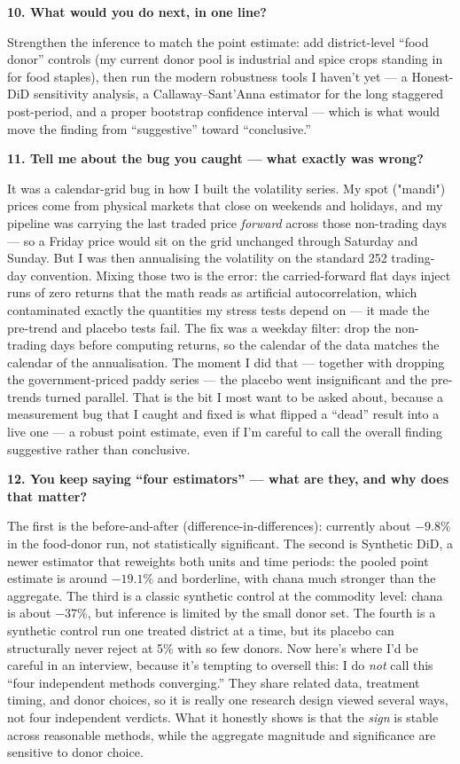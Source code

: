 \documentclass[11pt]{article}
\newcommand{\Q}[1]{\medskip\noindent\textbf{#1}\par}
\newcommand{\A}{\noindent}
\begin{document}
\Q{10. What would you do next, in one line?}
\A Strengthen the inference to match the point estimate: add district-level ``food donor'' controls
(my current donor pool is industrial and spice crops standing in for food staples), then run the
modern robustness tools I haven't yet --- a Honest-DiD sensitivity analysis, a Callaway--Sant'Anna
estimator for the long staggered post-period, and a proper bootstrap confidence interval --- which is
what would move the finding from ``suggestive'' toward ``conclusive.''

\Q{11. Tell me about the bug you caught --- what exactly was wrong?}
\A It was a calendar-grid bug in how I built the volatility series. My spot ("mandi") prices come
from physical markets that close on weekends and holidays, and my pipeline was carrying the last
traded price \emph{forward} across those non-trading days --- so a Friday price would sit on the grid
unchanged through Saturday and Sunday. But I was then annualising the volatility on the standard 252
trading-day convention. Mixing those two is the error: the carried-forward flat days inject runs of
zero returns that the math reads as artificial autocorrelation, which contaminated exactly the
quantities my stress tests depend on --- it made the pre-trend and placebo tests fail. The fix was a
weekday filter: drop the non-trading days before computing returns, so the calendar of the data
matches the calendar of the annualisation. The moment I did that --- together with dropping the
government-priced paddy series --- the placebo went insignificant and the pre-trends turned parallel.
That is the bit I most want to be asked about, because a measurement bug that I caught and fixed is
what flipped a ``dead'' result into a live one --- a robust point estimate, even if I'm careful to
call the overall finding suggestive rather than conclusive.

\Q{12. You keep saying ``four estimators'' --- what are they, and why does that matter?}
\A The first is the before-and-after (difference-in-differences): currently about $-9.8\%$ in the
food-donor run, not statistically significant. The second is Synthetic DiD, a newer estimator that
reweights both units and time periods: the pooled point estimate is around $-19.1\%$ and borderline,
with chana much stronger than the aggregate. The third is a classic synthetic control at the
commodity level: chana is about $-37\%$, but inference is limited by the small donor set. The fourth
is a synthetic control run one treated district at a time, but its placebo can structurally never
reject at 5\% with so few donors. Now here's where I'd be careful in an interview, because it's
tempting to oversell this: I do \emph{not} call this ``four independent methods converging.'' They
share related data, treatment timing, and donor choices, so it is really one research design viewed
several ways, not four independent verdicts. What it honestly shows is that the \emph{sign} is stable
across reasonable methods, while the aggregate magnitude and significance are sensitive to donor
choice.
\end{document}
